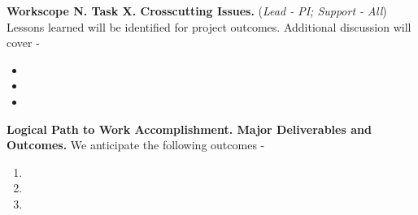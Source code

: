 \documentclass[11pt,letterpaper]{article}
\begin{document}
\noindent\textbf{Workscope N. Task X. Crosscutting Issues.} (\textit{Lead - PI; Support - All}) Lessons learned will be identified for project outcomes. Additional discussion will cover -
\begin{itemize}[topsep=0pt,itemsep=-1ex,partopsep=1ex,parsep=1ex]
    \item
    \item
    \item
\end{itemize}

\noindent\textbf{Logical Path to Work Accomplishment. Major Deliverables and Outcomes.} We anticipate the following outcomes -
\begin{enumerate}[topsep=0pt,itemsep=-1ex,partopsep=1ex,parsep=1ex]
    \item
    \item
    \item
\end{enumerate}

\vspace{\baselineskip}
\end{document}
